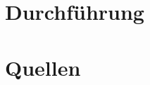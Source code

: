 \documentclass[]{scrartcl}
\begin{document}
\section{Durchführung}

\section{Quellen}
\end{document}
